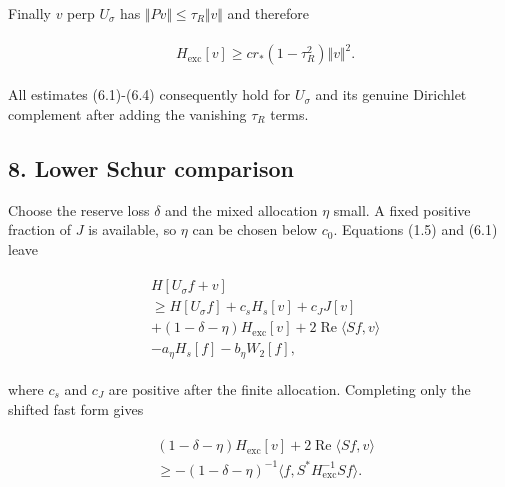 Finally \(v\) perp \(U_{\sigma}\) has
\(\Vert Pv\Vert \le \tau _{R}\Vert v\Vert\) and therefore

\begin{gather*}
\begin{aligned}
& H_{\mathrm{exc}}[v]\ge c r_{*}(1-\tau _{R}^{2})\Vert v\Vert ^{2}.
\end{aligned}\tag{7.3}
\end{gather*}

All estimates (6.1)-(6.4) consequently hold for \(U_{\sigma}\) and its
genuine Dirichlet complement after adding the vanishing \(\tau _{R}\)
terms.

\subsection{8. Lower Schur comparison}\label{i-lower-schur-comparison}

Choose the reserve loss \(\delta\) and the mixed allocation \(\eta\)
small. A fixed positive fraction of \(J\) is available, so \(\eta\) can
be chosen below \(c_{0}\). Equations (1.5) and (6.1) leave

\begin{gather*}
\begin{aligned}
& H[U_{\sigma} f+v] \\
& \ge H[U_{\sigma} f]+c_{s} H_{s}[v]+c_{J} J[v] \\
& +(1-\delta -\eta )H_{\mathrm{exc}}[v]+2\operatorname{Re} \langle Sf,v\rangle \\
& -a_{\eta} H_{s}[f]-b_{\eta} W_{2}[f],
\end{aligned}\tag{8.1}
\end{gather*}

where \(c_{s}\) and \(c_{J}\) are positive after the finite allocation.
Completing only the shifted fast form gives

\begin{gather*}
\begin{aligned}
& (1-\delta -\eta )H_{\mathrm{exc}}[v]+2\operatorname{Re} \langle Sf,v\rangle \\
& \ge -(1-\delta -\eta )^{-1}\langle f,S^{*}H_{\mathrm{exc}}^{-1}Sf\rangle .
\end{aligned}\tag{8.2}
\end{gather*}

